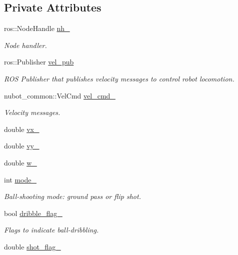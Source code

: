 \subsection*{Private Attributes}
\begin{DoxyCompactItemize}
\item 
ros\-::\-Node\-Handle \hyperlink{classnubot_1_1NubotTeleopKey_aa0685c9872576f6ce3b19b6f467e5cee}{nh\-\_\-}
\begin{DoxyCompactList}\small\item\em Node handler. \end{DoxyCompactList}\item 
ros\-::\-Publisher \hyperlink{classnubot_1_1NubotTeleopKey_af2b940ed562da027c7eda729403e4f86}{vel\-\_\-pub}
\begin{DoxyCompactList}\small\item\em R\-O\-S Publisher that publishes velocity messages to control robot locomotion. \end{DoxyCompactList}\item 
nubot\-\_\-common\-::\-Vel\-Cmd \hyperlink{classnubot_1_1NubotTeleopKey_a7c70e3f5f30f940e9c508deb84f23da5}{vel\-\_\-cmd\-\_\-}
\begin{DoxyCompactList}\small\item\em Velocity messages. \end{DoxyCompactList}\item 
double \hyperlink{classnubot_1_1NubotTeleopKey_aafe296ec15a99f249180144842c64b29}{vx\-\_\-}
\item 
double \hyperlink{classnubot_1_1NubotTeleopKey_a9bd6bb13fc993a07fb3d2272d3e2a600}{vy\-\_\-}
\item 
double \hyperlink{classnubot_1_1NubotTeleopKey_a40143b187fb9f6278b0c2847acd3d756}{w\-\_\-}
\item 
int \hyperlink{classnubot_1_1NubotTeleopKey_a5d4f917773136b83f6ba268f50c8a0ea}{mode\-\_\-}
\begin{DoxyCompactList}\small\item\em Ball-\/shooting mode\-: ground pass or flip shot. \end{DoxyCompactList}\item 
bool \hyperlink{classnubot_1_1NubotTeleopKey_a91a6e9ae14ee91dfa3880ab840d03ca1}{dribble\-\_\-flag\-\_\-}
\begin{DoxyCompactList}\small\item\em Flags to indicate ball-\/dribbling. \end{DoxyCompactList}\item 
double \hyperlink{classnubot_1_1NubotTeleopKey_a90a481a3a66e64083a27945def47f4ae}{shot\-\_\-flag\-\_\-}

\end{DoxyCompactItemize}
